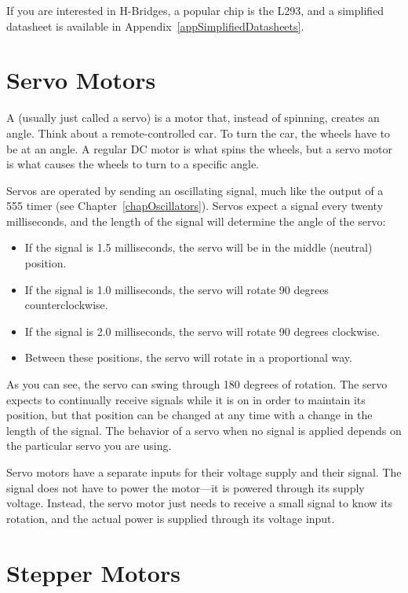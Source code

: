 If you are interested in H-Bridges, a popular chip is the L293, and a simplified datasheet is available in Appendix~\ref{appSimplifiedDatasheets}.

\section{Servo Motors}

A  (usually just called a servo) is a motor that, instead of spinning, creates an angle.
Think about a remote-controlled car.
To turn the car, the wheels have to be at an angle.
A regular DC motor is what spins the wheels, but a servo motor is what causes the wheels to turn to a specific angle.

Servos are operated by sending an oscillating signal, much like the output of a 555 timer (see Chapter~\ref{chapOscillators}).
Servos expect a signal every twenty milliseconds, and the length of the signal will determine the angle of the servo:

\begin{itemize}
\item If the signal is 1.5 milliseconds, the servo will be in the middle (neutral) position.
\item If the signal is 1.0 milliseconds, the servo will rotate 90 degrees counterclockwise.
\item If the signal is 2.0 milliseconds, the servo will rotate 90 degrees clockwise.
\item Between these positions, the servo will rotate in a proportional way.
\end{itemize}

As you can see, the servo can swing through 180 degrees of rotation.
The servo expects to continually receive signals while it is on in order to maintain its position, but that position can be changed at any time with a change in the length of the signal.
The behavior of a servo when no signal is applied depends on the particular servo you are using.

Servo motors have a separate inputs for their voltage supply and their signal.
The signal does not have to power the motor---it is powered through its supply voltage.
Instead, the servo motor just needs to receive a small signal to know its rotation, and the actual power is supplied through its voltage input.

\section{Stepper Motors}

